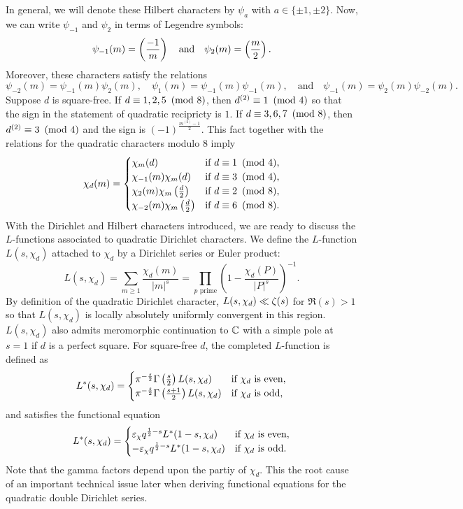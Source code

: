 \documentclass[12pt,reqno,oneside]{amsart}
\begin{document}
    In general, we will denote these Hilbert characters by $\psi_{a}$ with $a \in \{\pm 1,\pm 2\}$. Now, we can write $\psi_{-1}$ and $\psi_{2}$ in terms of Legendre symbols:
    \[
        \psi_{-1}(m) = \left(\frac{-1}{m}\right) \quad \text{and} \quad \psi_{2}(m) = \left(\frac{m}{2}\right).
    \]
    Moreover, these characters satisfy the relations
    \[
        \psi_{-2}(m) = \psi_{-1}(m)\psi_{2}(m), \quad \psi_{1}(m) = \psi_{-1}(m)\psi_{-1}(m), \quad \text{and} \quad \psi_{-1}(m) = \psi_{2}(m)\psi_{-2}(m).
    \]
    Suppose $d$ is square-free. If $d \equiv 1,2,5 \ \left(\text{mod }8\right)$, then $d^{(2)} \equiv 1 \ \left(\text{mod }4\right)$ so that the sign in the statement of quadratic recipricty is $1$. If $d \equiv 3,6,7 \ \left(\text{mod }8\right)$, then $d^{(2)} \equiv 3 \ \left(\text{mod }4\right)$ and the sign is $(-1)^{\frac{m^{(2)}-1}{2}}$. This fact together with the relations for the quadratic characters modulo $8$ imply
    \[
        \chi_{d}(m) = \begin{cases} \chi_{m}(d) & \text{if $d \equiv 1 \ \left(\text{mod }4\right)$}, \\ \chi_{-1}(m)\chi_{m}(d) & \text{if $d \equiv 3 \ \left(\text{mod }4\right)$}, \\ \chi_{2}(m)\chi_{m}\left(\frac{d}{2}\right) & \text{if $d \equiv 2 \ \left(\text{mod }8\right)$}, \\ \chi_{-2}(m)\chi_{m}\left(\frac{d}{2}\right) & \text{if $d \equiv 6 \ \left(\text{mod }8\right)$}. \end{cases}
    \]
    With the Dirichlet and Hilbert characters introduced, we are ready to discuss the $L$-functions associated to quadratic Dirichlet characters. We define the $L$-function $L(s,\chi_{d})$ attached to $\chi_{d}$ by a Dirichlet series or Euler product:
    \[
        L(s,\chi_{d}) = \sum_{m \ge 1}\frac{\chi_{d}(m)}{|m|^{s}} = \prod_{p \text{ prime}}\left(1-\frac{\chi_{d}(P)}{|P|^{s}}\right)^{-1}.
    \]
    By definition of the quadratic Dirichlet character, $L(s,\chi_{d}) \ll \zeta(s)$ for $\Re(s) > 1$ so that $L(s,\chi_{d})$ is locally absolutely uniformly convergent in this region. $L(s,\chi_{d})$ also admits meromorphic continuation to $\mathbb{C}$ with a simple pole at $s = 1$ if $d$ is a perfect square. For square-free $d$, the completed $L$-function is defined as
    \[
        L^{\ast}(s,\chi_{d}) = \begin{cases} \pi^{-\frac{s}{2}}\Gamma\left(\frac{s}{2}\right)L(s,\chi_{d}) & \text{if $\chi_{d}$ is even}, \\ \pi^{-\frac{s}{2}}\Gamma\left(\frac{s+1}{2}\right)L(s,\chi_{d}) & \text{if $\chi_{d}$ is odd}, \end{cases}
    \]
    and satisfies the functional equation
    \[
        L^{\ast}(s,\chi_{d}) = \begin{cases} \varepsilon_{\chi}q^{\frac{1}{2}-s}L^{\ast}(1-s,\chi_{d}) & \text{if $\chi_{d}$ is even}, \\ -\varepsilon_{\chi}q^{\frac{1}{2}-s}L^{\ast}(1-s,\chi_{d}) & \text{if $\chi_{d}$ is odd}. \end{cases}
    \]
    Note that the gamma factors depend upon the partiy of $\chi_{d}$. This the root cause of an important technical issue later when deriving functional equations for the quadratic double Dirichlet series.
\end{document}
